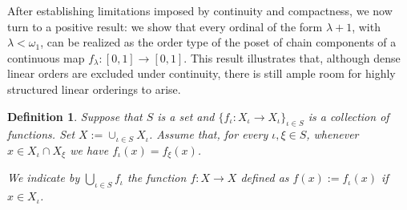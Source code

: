 \documentclass[pdflatex,sn-mathphys-num]{sn-jnl}
\theoremstyle{thmstyleone}%
\theoremstyle{thmstyletwo}%
\theoremstyle{thmstylethree}%
\newtheorem{defi}{Definition}%
\begin{document}
\noindent After establishing limitations imposed by continuity and compactness, we now turn to a positive result: we show that every ordinal of the form $\lambda+1$, with $\lambda<\omega_1$,  can be realized as the order type of the poset of chain components of a continuous map $f_\lambda:[0,1]\to [0,1]$. This result illustrates that, although dense linear orders are excluded under continuity, there is still ample room for highly structured linear orderings to arise.
\begin{defi}
    Suppose that $S$ is a set and $\{f_\iota:X_\iota\to X_\iota\}_{\iota\in S}$ is a collection of functions. Set $X:=\cup_{\iota\in S}X_\iota$. Assume that, for every $\iota,\xi\in S$, whenever $x\in X_\iota\cap X_\xi$ we have $f_\iota(x)=f_\xi(x)$. 
    
   \noindent  We indicate by $\bigcup_{\iota\in S}f_\iota$ the function $f:X\to X$ defined as $f(x):=f_\iota(x)$ if $x\in X_\iota$.
\end{defi}
\end{document}

